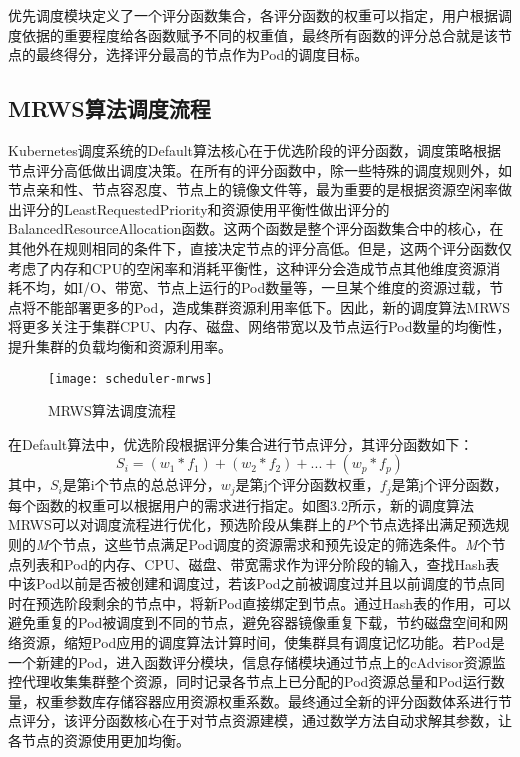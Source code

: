 优先调度模块定义了一个评分函数集合，各评分函数的权重可以指定，用户根据调度依据的重要程度给各函数赋予不同的权重值，最终所有函数的评分总合就是该节点的最终得分，选择评分最高的节点作为Pod的调度目标。

\subsection{MRWS算法调度流程}
Kubernetes调度系统的Default算法核心在于优选阶段的评分函数，调度策略根据节点评分高低做出调度决策。在所有的评分函数中，除一些特殊的调度规则外，如节点亲和性、节点容忍度、节点上的镜像文件等，最为重要的是根据资源空闲率做出评分的LeastRequestedPriority和资源使用平衡性做出评分的BalancedResourceAllocation函数。这两个函数是整个评分函数集合中的核心，在其他外在规则相同的条件下，直接决定节点的评分高低。但是，这两个评分函数仅考虑了内存和CPU的空闲率和消耗平衡性，这种评分会造成节点其他维度资源消耗不均，如I/O、带宽、节点上运行的Pod数量等，一旦某个维度的资源过载，节点将不能部署更多的Pod，造成集群资源利用率低下。因此，新的调度算法MRWS将更多关注于集群CPU、内存、磁盘、网络带宽以及节点运行Pod数量的均衡性，提升集群的负载均衡和资源利用率。
\begin{figure}[H] %
	\centering
	\texttt{[image: scheduler-mrws]}
	\caption{MRWS算法调度流程}
\end{figure}
在Default算法中，优选阶段根据评分集合进行节点评分，其评分函数如下：
\begin{equation}
	S_{i} = (w_{1}*f_{1})+(w_{2}*f_{2})+...+(w_{p}*f_{p})
\end{equation}
其中，\begin{math}S_{i}\end{math}是第i个节点的总总评分，\begin{math}w_{j}\end{math}是第j个评分函数权重，\begin{math}f_{j}\end{math}是第j个评分函数，每个函数的权重可以根据用户的需求进行指定。如图3.2所示，新的调度算法MRWS可以对调度流程进行优化，预选阶段从集群上的\emph{P}个节点选择出满足预选规则的\emph{M}个节点，这些节点满足Pod调度的资源需求和预先设定的筛选条件。\emph{M}个节点列表和Pod的内存、CPU、磁盘、带宽需求作为评分阶段的输入，查找Hash表中该Pod以前是否被创建和调度过，若该Pod之前被调度过并且以前调度的节点同时在预选阶段剩余的节点中，将新Pod直接绑定到节点。通过Hash表的作用，可以避免重复的Pod被调度到不同的节点，避免容器镜像重复下载，节约磁盘空间和网络资源，缩短Pod应用的调度算法计算时间，使集群具有调度记忆功能。若Pod是一个新建的Pod，进入函数评分模块，信息存储模块通过节点上的cAdvisor资源监控代理收集集群整个资源，同时记录各节点上已分配的Pod资源总量和Pod运行数量，权重参数库存储容器应用资源权重系数。最终通过全新的评分函数体系进行节点评分，该评分函数核心在于对节点资源建模，通过数学方法自动求解其参数，让各节点的资源使用更加均衡。


